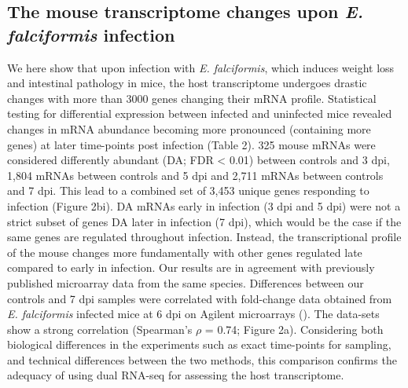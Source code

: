 \documentclass{bmcart}
\begin{document}
\subsection*{The mouse transcriptome changes upon \emph{E. falciformis} infection}
We here show that upon infection with \textit{E. falciformis}, which induces weight loss and intestinal pathology in mice, the host transcriptome undergoes drastic changes with more than 3000 genes changing their mRNA profile.  Statistical testing for differential expression between infected and uninfected mice revealed changes in mRNA abundance becoming more pronounced (containing more genes) at later time-points post infection (Table 2). 325 mouse mRNAs were considered differently abundant (DA; FDR < 0.01) between controls and 3 dpi, 1,804 mRNAs between controls and 5 dpi and 2,711 mRNAs between controls and 7 dpi. This lead to a combined set of 3,453 unique genes responding to infection (Figure 2bi). DA mRNAs early in infection (3 dpi and 5 dpi) were not a strict subset of genes DA later in infection (7 dpi), which would be the case if the same genes are regulated throughout infection. Instead, the transcriptional profile of the mouse changes more fundamentally with other genes regulated late compared to early in infection. Our results are in agreement with previously published microarray data from the same species. Differences between our controls and 7 dpi samples were correlated with fold-change data obtained from \textit{E. falciformis} infected mice at 6 dpi on Agilent microarrays (\cite{schmidt12}). The data-sets show a strong correlation (Spearman's $\rho$ = 0.74; Figure 2a). Considering both biological differences in the experiments such as exact time-points for sampling, and technical differences between the two methods, this comparison confirms the adequacy of using dual RNA-seq for assessing the host transcriptome.
\end{document}
